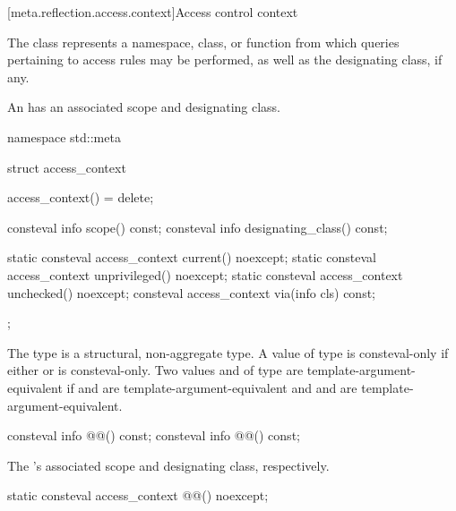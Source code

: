 [meta.reflection.access.context]{Access control context}

\pnum
The class 
represents a namespace, class, or function
from which queries pertaining to access rules may be performed,
as well as the designating class, if any.

%
\pnum
An  has an associated scope and designating class.

%
\begin{codeblock}
namespace std::meta {
  struct access_context {
    access_context() = delete;

    consteval info scope() const;
    consteval info designating_class() const;

    static consteval access_context current() noexcept;
    static consteval access_context unprivileged() noexcept;
    static consteval access_context unchecked() noexcept;
    consteval access_context via(info cls) const;
  };
}
\end{codeblock}

\pnum
The type  is a structural, non-aggregate type.
A value  of type  is consteval-only if
either  or  is consteval-only.
Two values  and  of type 
are template-argument-equivalent
if  and  are template-argument-equivalent
and  and 
are template-argument-equivalent.

\begin{itemdecl}
consteval info @@() const;
consteval info @@() const;
\end{itemdecl}

\begin{itemdescr}
\pnum
\returns
The 's associated scope
and designating class, respectively.
\end{itemdescr}

\begin{itemdecl}
static consteval access_context @@() noexcept;
\end{itemdecl}

